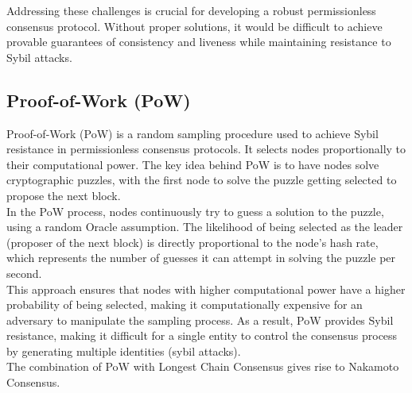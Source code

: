 Addressing these challenges is crucial for developing a robust permissionless consensus protocol. Without proper solutions, it would be difficult to achieve provable guarantees of consistency and liveness while maintaining resistance to Sybil attacks.

\subsection{Proof-of-Work (PoW)}
Proof-of-Work (PoW) is a random sampling procedure used to achieve Sybil resistance in permissionless consensus protocols. It selects nodes proportionally to their computational power. The key idea behind PoW is to have nodes solve cryptographic puzzles, with the first node to solve the puzzle getting selected to propose the next block.\\
In the PoW process, nodes continuously try to guess a solution to the puzzle, using a random Oracle assumption. The likelihood of being selected as the leader (proposer of the next block) is directly proportional to the node's hash rate, which represents the number of guesses it can attempt in solving the puzzle per second.\\
This approach ensures that nodes with higher computational power have a higher probability of being selected, making it computationally expensive for an adversary to manipulate the sampling process. As a result, PoW provides Sybil resistance, making it difficult for a single entity to control the consensus process by generating multiple identities (sybil attacks).\\
The combination of PoW with Longest Chain Consensus gives rise to Nakamoto Consensus.



